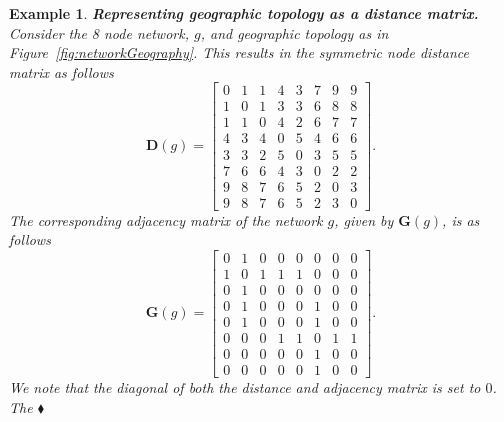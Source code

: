 \documentclass[11pt,fleqn]{article}
\newtheorem{expl}[theorem]{Example}
\newenvironment{example}{\begin{expl} \rm}{\hfill $\blacklozenge$ \end{expl}}{}
\begin{document}
\begin{example} 
\textbf{Representing geographic topology as a distance matrix.}
Consider the 8 node network, $g$, and geographic topology as in Figure~\ref{fig:networkGeography}. This results in the symmetric node distance matrix as follows
\[
\mathbf{D}(g) = 
\begin{bmatrix}
0 & 1 & 1 & 4 & 3 & 7 & 9 & 9 \\
1 & 0 & 1 & 3 & 3 & 6 & 8 & 8 \\
1 & 1 & 0 & 4 & 2 & 6 & 7 & 7 \\
4 & 3 & 4 & 0 & 5 & 4 & 6 & 6 \\
3 & 3 & 2 & 5 & 0 & 3 & 5 & 5 \\
7 & 6 & 6 & 4 & 3 & 0 & 2 & 2 \\
9 & 8 & 7 & 6 & 5 & 2 & 0 & 3 \\
9 & 8 & 7 & 6 & 5 & 2 & 3 & 0
\end{bmatrix}.
\]
The corresponding adjacency matrix of the network $g$, given by $\mathbf{G}(g)$, is as follows
\[
\mathbf{G}(g) = 
\begin{bmatrix}
0 & 1 & 0 & 0 & 0 & 0 & 0 & 0 \\
1 & 0 & 1 & 1 & 1 & 0 & 0 & 0 \\
0 & 1 & 0 & 0 & 0 & 0 & 0 & 0 \\
0 & 1 & 0 & 0 & 0 & 1 & 0 & 0 \\
0 & 1 & 0 & 0 & 0 & 1 & 0 & 0 \\
0 & 0 & 0 & 1 & 1 & 0 & 1 & 1 \\
0 & 0 & 0 & 0 & 0 & 1 & 0 & 0 \\
0 & 0 & 0 & 0 & 0 & 1 & 0 & 0
\end{bmatrix}.
\]
We note that the diagonal of both the distance and adjacency matrix is set to $0$. The 
\end{example}
\end{document}
